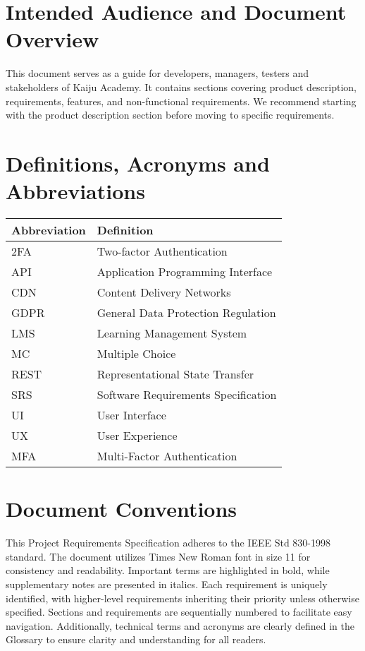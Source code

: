 \documentclass[a4paper, 11pt]{scrreprt}
\begin{document}
\section{Intended Audience and Document Overview}
This document serves as a guide for developers, managers, testers and stakeholders of Kaiju Academy. It contains sections covering product description, requirements, features, and non-functional requirements. We recommend starting with the product description section before moving to specific requirements.

\section{Definitions, Acronyms and Abbreviations}
\begin{center}
    \begin{tabularx}{\textwidth}{lX}
        \toprule
        \textbf{Abbreviation} & \textbf{Definition} \\
        \midrule
        2FA & Two-factor Authentication \\
        API & Application Programming Interface \\
        CDN & Content Delivery Networks \\
        GDPR & General Data Protection Regulation \\
        LMS & Learning Management System \\
        MC & Multiple Choice \\
        REST & Representational State Transfer \\
        SRS & Software Requirements Specification \\
        UI & User Interface \\
        UX & User Experience \\
        MFA & Multi-Factor Authentication \\
        \bottomrule
    \end{tabularx}
\end{center}

\section{Document Conventions}
This Project Requirements Specification adheres to the IEEE Std 830-1998 standard. The document utilizes Times New Roman font in size 11 for consistency and readability. Important terms are highlighted in bold, while supplementary notes are presented in italics. Each requirement is uniquely identified, with higher-level requirements inheriting their priority unless otherwise specified. Sections and requirements are sequentially numbered to facilitate easy navigation. Additionally, technical terms and acronyms are clearly defined in the Glossary to ensure clarity and understanding for all readers.
\end{document}
